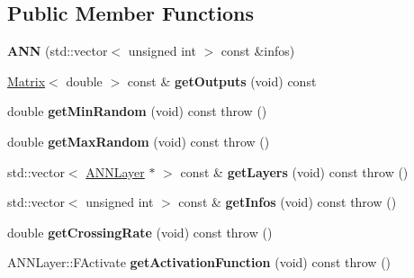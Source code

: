 \subsection*{Public Member Functions}
\begin{DoxyCompactItemize}
\item 
\hypertarget{class_g_a_n_n_1_1_a_n_n_a8b7b98feba4aea412db698035cdcb418}{}{\bfseries A\+N\+N} (std\+::vector$<$ unsigned int $>$ const \&infos)\label{class_g_a_n_n_1_1_a_n_n_a8b7b98feba4aea412db698035cdcb418}

\item 
\hypertarget{class_g_a_n_n_1_1_a_n_n_a0303bfc7a9de4d36ad50df27d6a0b307}{}\hyperlink{class_g_a_n_n_1_1_matrix}{Matrix}$<$ double $>$ const \& {\bfseries get\+Outputs} (void) const \label{class_g_a_n_n_1_1_a_n_n_a0303bfc7a9de4d36ad50df27d6a0b307}

\item 
\hypertarget{class_g_a_n_n_1_1_a_n_n_a732ada0242d9ac9a9a52c7f0c09ca26a}{}double {\bfseries get\+Min\+Random} (void) const   throw ()\label{class_g_a_n_n_1_1_a_n_n_a732ada0242d9ac9a9a52c7f0c09ca26a}

\item 
\hypertarget{class_g_a_n_n_1_1_a_n_n_a3baaedfda1392d8eea5c9a814567626d}{}double {\bfseries get\+Max\+Random} (void) const   throw ()\label{class_g_a_n_n_1_1_a_n_n_a3baaedfda1392d8eea5c9a814567626d}

\item 
\hypertarget{class_g_a_n_n_1_1_a_n_n_aae0bb973b321fa30761fdca66cf3be3c}{}std\+::vector$<$ \hyperlink{class_g_a_n_n_1_1_a_n_n_layer}{A\+N\+N\+Layer} $\ast$ $>$ const \& {\bfseries get\+Layers} (void) const   throw ()\label{class_g_a_n_n_1_1_a_n_n_aae0bb973b321fa30761fdca66cf3be3c}

\item 
\hypertarget{class_g_a_n_n_1_1_a_n_n_a2c692cd8c701e1aa9b756e4a2151e651}{}std\+::vector$<$ unsigned int $>$ const \& {\bfseries get\+Infos} (void) const   throw ()\label{class_g_a_n_n_1_1_a_n_n_a2c692cd8c701e1aa9b756e4a2151e651}

\item 
\hypertarget{class_g_a_n_n_1_1_a_n_n_a0f0cfbbfd49b831516075cd6360366ad}{}double {\bfseries get\+Crossing\+Rate} (void) const   throw ()\label{class_g_a_n_n_1_1_a_n_n_a0f0cfbbfd49b831516075cd6360366ad}

\item 
\hypertarget{class_g_a_n_n_1_1_a_n_n_ab94e7f60a43f5bef2314529075a95487}{}A\+N\+N\+Layer\+::\+F\+Activate {\bfseries get\+Activation\+Function} (void) const   throw ()\label{class_g_a_n_n_1_1_a_n_n_ab94e7f60a43f5bef2314529075a95487}


\end{DoxyCompactItemize}
